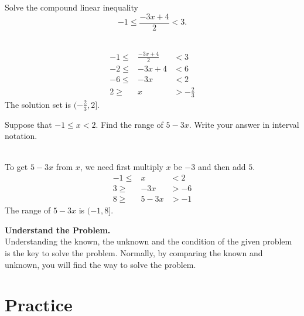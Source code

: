 \documentclass[
  en,11pt]{elegantbook}
\newcommand{\size}[2]{{\fontsize{#1}{0}\selectfont#2}}
\newenvironment{rmdtip}{
	\vspace*{0.5\baselineskip}
	\par\noindent
	\makebox[-3pt][r]{\color{red!90}\size{12}{\HandRight}\,\,}
    \begin{tcolorbox}[
    enhanced,
    title={\textbf{\color{second}Tips}},
    title style={left color=blue!10!green!20!white,right color=yellow!20!blue!20!white},
    colback=cyan!10!white,
    ]
    \sffamily
}{
    \end{tcolorbox}
    \par\ignorespacesafterend
}
\let\BeginKnitrBlock\begin \let\EndKnitrBlock\end
\begin{document}
\BeginKnitrBlock{example}
\protect\hypertarget{exm:unnamed-chunk-204}{}{\label{exm:unnamed-chunk-204} }
Solve the compound linear inequality
\[
-1\leq \dfrac{-3x+4}{2}<3.
\]
\EndKnitrBlock{example}

\BeginKnitrBlock{solution}
{}\\

\[
\begin{array}{rcl}
    -1\leq & \frac{-3x+4}{2}  & <3        \\
    -2\leq & -3x+4          & <6        \\
    -6\leq & -3x           & <2        \\
    2\geq  & x            & >-\frac23
\end{array}
\]
The solution set is \((-\frac23, 2]\).
\EndKnitrBlock{solution}

\BeginKnitrBlock{example}
\protect\hypertarget{exm:unnamed-chunk-206}{}{\label{exm:unnamed-chunk-206} }
Suppose that \(-1\le x < 2\). Find the range of \(5-3x\). Write your answer in interval notation.
\EndKnitrBlock{example}

\BeginKnitrBlock{solution}
{}\\

To get \(5-3x\) from \(x\), we need first multiply \(x\) be \(-3\) and then add \(5\).
\[
\begin{array}{rcl}
-1\leq & x          & < 2        \\
3\geq & -3x         & >-6        \\
8\geq & 5-3x      & >-1
\end{array}
\]
The range of \(5-3x\) is \((-1, 8]\).
\EndKnitrBlock{solution}

\begin{rmdtip}

\textbf{Understand the Problem.}\\
Understanding the known, the unknown and the condition of the given problem is the key to solve the problem. Normally, by comparing the known and unknown, you will find the way to solve the problem.

\end{rmdtip}

\newpage

\hypertarget{practice-9}{%
\section{Practice}\label{practice-9}}
\end{document}
